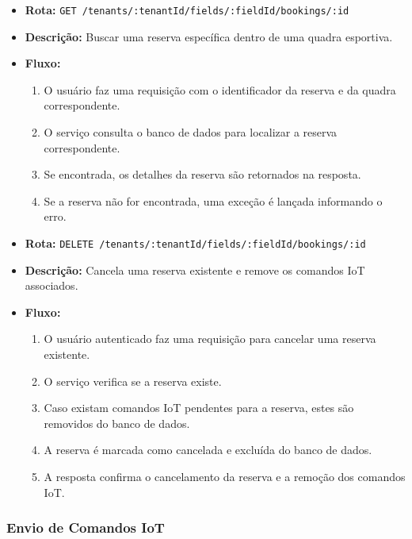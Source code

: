 \begin{itemize}
    \item \textbf{Rota:} \texttt{GET /tenants/:tenantId/fields/:fieldId/bookings/:id}
    \item \textbf{Descrição:} Buscar uma reserva específica dentro de uma quadra esportiva.
    \item \textbf{Fluxo:}
    \begin{enumerate}
        \item O usuário faz uma requisição com o identificador da reserva e da quadra correspondente.
        \item O serviço consulta o banco de dados para localizar a reserva correspondente.
        \item Se encontrada, os detalhes da reserva são retornados na resposta.
        \item Se a reserva não for encontrada, uma exceção é lançada informando o erro.
    \end{enumerate}
\end{itemize}

\begin{itemize}
    \item \textbf{Rota:} \texttt{DELETE /tenants/:tenantId/fields/:fieldId/bookings/:id}
    \item \textbf{Descrição:} Cancela uma reserva existente e remove os comandos IoT associados.
    \item \textbf{Fluxo:}
    \begin{enumerate}
        \item O usuário autenticado faz uma requisição para cancelar uma reserva existente.
        \item O serviço verifica se a reserva existe.
        \item Caso existam comandos IoT pendentes para a reserva, estes são removidos do banco de dados.
        \item A reserva é marcada como cancelada e excluída do banco de dados.
        \item A resposta confirma o cancelamento da reserva e a remoção dos comandos IoT.
    \end{enumerate}
\end{itemize}

\subsubsection{Envio de Comandos IoT}\label{subsubsec:envio_comandos_iot}

